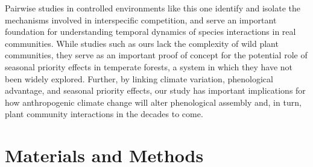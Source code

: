 \documentclass{article}[11pt]
\begin{document}
Pairwise studies in controlled environments like this one identify and isolate the mechanisms involved in interspecific competition, and serve an important foundation for understanding temporal dynamics of species interactions in real communities. While studies such as ours lack the complexity of wild plant communities, they serve as an important proof of concept for the potential role of seasonal priority effects in temperate forests, a system in which they have not been widely explored. Further, by linking climate variation, phenological advantage, and seasonal priority effects, our study has important implications for how anthropogenic climate change will alter phenological assembly and, in turn, plant community interactions in the decades to come.



\section*{Materials and Methods}
\end{document}
